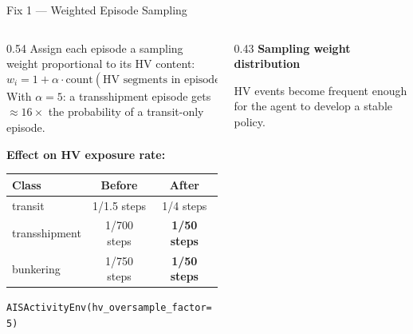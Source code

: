 \documentclass[aspectratio=169,10pt]{beamer}
\begin{document}
\begin{frame}{Fix 1 — Weighted Episode Sampling}
  \begin{columns}[T]
    \begin{column}{0.54\textwidth}
      Assign each episode a sampling weight proportional to its HV content:
      \[
        w_i = 1 + \alpha \cdot \text{count}(\text{HV segments in episode}_i)
      \]
      With $\alpha = 5$: a transshipment episode gets $\approx 16\times$
      the probability of a transit-only episode.

      \bigskip
      \textbf{Effect on HV exposure rate:}

      \medskip
      \begin{tabular}{lcc}
        \toprule
        Class & Before & After \\
        \midrule
        transit & 1/1.5 steps & 1/4 steps \\
        transshipment & 1/700 steps & \textbf{1/50 steps} \\
        bunkering & 1/750 steps & \textbf{1/50 steps} \\
        \bottomrule
      \end{tabular}

      \bigskip
      \texttt{AISActivityEnv(hv\_oversample\_factor=5)}
    \end{column}
    \begin{column}{0.43\textwidth}
      \textbf{Sampling weight distribution}


      HV events become frequent enough for the agent to develop a stable policy.
    \end{column}
  \end{columns}
\end{frame}
\end{document}
